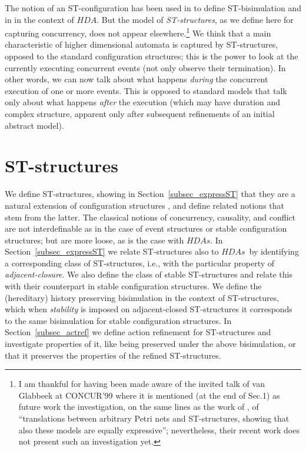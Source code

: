\documentclass[submission,copyright,creativecommons]{eptcs}
\newcounter{case}
\newcommand\HDA{\ensuremath{\mathit{HDA}}}
\newcommand\HDAs{\ensuremath{\mathit{HDAs}}}
\begin{document}
The notion of an ST-configuration  has been used in \cite{GlabbeekV97splitting} to define ST-bisimulation and in \cite{Glabbeek06HDA} in the context of \HDA. But the model of \textit{ST-structures}, as we define here for capturing concurrency, does not appear elsewhere.\footnote{I am thankful for having been made aware of the invited talk of van Glabbeek at CONCUR'99 \cite{Glabbeek99invitedCONCUR} where it is mentioned (at the end of Sec.1) as future work the investigation, on the same lines as the work of \cite{GlabbeekP95config}, of ``translations between arbitrary Petri nets and ST-structures, showing that also these models are equally expressive''; nevertheless, their recent work \cite{GlabbeekP09configStruct} does not present such an investigation yet.} We think that a main characteristic of higher dimensional automata is captured by ST-structures, opposed to the standard configuration structures; this is the power to look at the currently executing concurrent events (not only observe their termination). 
In other words, we can now talk about what happens \emph{during} the concurrent execution of one or more events. This is opposed to standard models that talk only about what happens \emph{after} the execution (which may have duration and complex structure, apparent only after subsequent refinements of an initial abstract model).





\section{ST-structures}\label{sec_st_configs}

We define ST-structures, showing in Section~\ref{subsec_expressST} that they are a natural extension of configuration structures \cite{GlabbeekP09configStruct}, and define related notions that stem from the latter. 
The classical notions of concurrency, causality, and conflict are not interdefinable as in the case of event structures or stable configuration structures; but are more loose, as is the case with \HDAs.
In Section~\ref{subsec_expressST} we relate ST-structures also to \HDAs\ by identifying a corresponding class of ST-structures, i.e., with the particular property of \textit{adjacent-closure}. We also define the class of stable ST-structures and relate this with their counterpart in stable configuration structures. 
We define the (hereditary) history preserving bisimulation in the context of ST-structures, which when \textit{stability} is imposed on adjacent-closed ST-structures it corresponds to the same bisimulation for stable configuration structures. 
In Section~\ref{subsec_actref} we define action refinement for ST-structures and investigate properties of it, like being preserved under the above bisimulation, or that it preserves the properties of the refined ST-structures.
\end{document}
